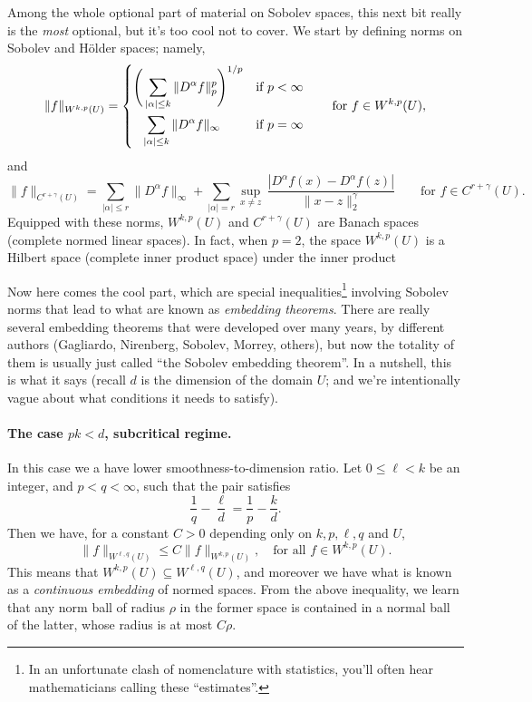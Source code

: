 \documentclass{article}
\begin{document}
Among the whole optional part of material on Sobolev spaces, this next bit   
really is the \emph{most} optional, but it's too cool not to cover. We start by
defining norms on Sobolev and H{\"o}lder spaces; namely,
\[
\|f\|_{W^{k,p}(U)} = 
\begin{dcases} 
\Bigg( \sum_{|\alpha| \leq k} \|D^\alpha f\|_p^p \Bigg)^{1/p} & \text{if $p <
  \infty$} \\
\;\;\; \sum_{|\alpha| \leq k} \|D^\alpha f\|_\infty & \text{if $p = \infty$}   
\end{dcases}
\qquad \text{for $f \in W^{k,p}(U)$},
\]
and 
\[
\|f\|_{C^{r+\gamma}(U)} = \sum_{|\alpha| \leq r} \|D^\alpha f\|_\infty +
\sum_{|\alpha| = r} \sup_{x \not= z} \, \frac{|D^\alpha f(x) - D^\alpha f(z)|} 
{\|x-z\|_2^\gamma}
\qquad \text{for $f \in C^{r+\gamma}(U)$}. 
\] 
Equipped with these norms, $W^{k,p}(U)$ and $C^{r+\gamma}(U)$ are Banach 
spaces (complete normed linear spaces). In fact, when $p=2$, the space
$W^{k,p}(U)$ is a Hilbert space (complete inner product space) under the inner
product 

Now here comes the cool part, which are special inequalities\footnote{In an
  unfortunate clash of nomenclature with statistics, you'll often hear
  mathematicians calling these ``estimates''.} involving Sobolev norms that lead 
to what are known as \emph{embedding theorems}. There are really several
embedding theorems that were developed over many years, by different authors
(Gagliardo, Nirenberg, Sobolev, Morrey, others), but now the totality of them is
usually just called ``the Sobolev embedding theorem''. In a nutshell, this is
what it says (recall $d$ is the dimension of the domain $U$; and we're
intentionally vague about what conditions it needs to satisfy).  

\paragraph{The case $pk < d$, subcritical regime.}

In this case we a have lower smoothness-to-dimension ratio. Let $0 \leq \ell <
k$ be an integer, and $p < q < \infty$, such that the pair satisfies   
\[
\frac{1}{q} - \frac{\ell}{d} = \frac{1}{p} - \frac{k}{d}.
\]
Then we have, for a constant $C>0$ depending only on $k,p,\ell,q$ and $U$, 
\[
\|f\|_{W^{\ell,q}(U)} \leq C \|f\|_{W^{k,p}(U)}, \quad \text{for all $f \in
  W^{k,p}(U)$}.
\]
This means that $W^{k,p}(U) \subseteq W^{\ell,q}(U)$, and moreover we have what 
is known as a \emph{continuous embedding} of normed spaces. From the above    
inequality, we learn that any norm ball of radius $\rho$ in the former space
is contained in a normal ball of the latter, whose radius is at most $C\rho$.
\end{document}
